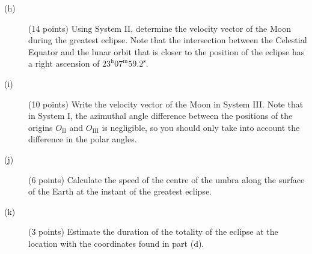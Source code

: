 \begin{description}
\item[(h)] (14 points) Using System II, determine the velocity vector of the
  Moon during the greatest eclipse. Note that the intersection between the
  Celestial Equator and the lunar orbit that is closer to the position of the
  eclipse has a right ascension of
  $23^{\mathrm{h}}07^{\mathrm{m}}59.2^{\mathrm{s}}$.
\item[(i)] (10 points) Write the velocity vector of the Moon in System III.
  Note that in System I, the azimuthal angle difference between the positions
  of the origins $O_{\mathrm{II}}$ and $O_{\mathrm{III}}$ is negligible, so
  you should only take into account the difference in the polar angles.
\item[(j)] (6 points) Calculate the speed of the centre of the umbra along
  the surface of the Earth at the instant of the greatest eclipse.
\item[(k)] (3 points) Estimate the duration of the totality of the eclipse at
  the location with the coordinates found in part (d).
\end{description}
